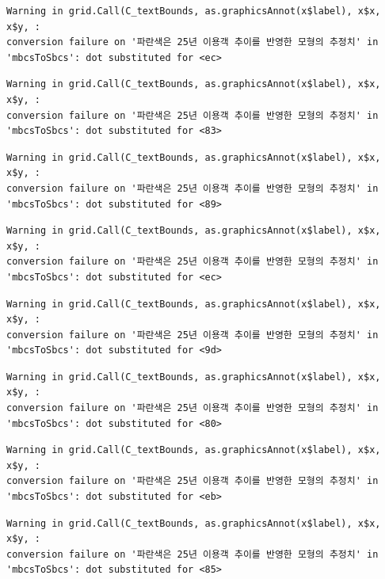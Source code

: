 \documentclass[
  letterpaper,
  DIV=11,
  numbers=noendperiod]{scrreprt}
\begin{document}
\begin{verbatim}
Warning in grid.Call(C_textBounds, as.graphicsAnnot(x$label), x$x, x$y, :
conversion failure on '파란색은 25년 이용객 추이를 반영한 모형의 추정치' in
'mbcsToSbcs': dot substituted for <ec>
\end{verbatim}

\begin{verbatim}
Warning in grid.Call(C_textBounds, as.graphicsAnnot(x$label), x$x, x$y, :
conversion failure on '파란색은 25년 이용객 추이를 반영한 모형의 추정치' in
'mbcsToSbcs': dot substituted for <83>
\end{verbatim}

\begin{verbatim}
Warning in grid.Call(C_textBounds, as.graphicsAnnot(x$label), x$x, x$y, :
conversion failure on '파란색은 25년 이용객 추이를 반영한 모형의 추정치' in
'mbcsToSbcs': dot substituted for <89>
\end{verbatim}

\begin{verbatim}
Warning in grid.Call(C_textBounds, as.graphicsAnnot(x$label), x$x, x$y, :
conversion failure on '파란색은 25년 이용객 추이를 반영한 모형의 추정치' in
'mbcsToSbcs': dot substituted for <ec>
\end{verbatim}

\begin{verbatim}
Warning in grid.Call(C_textBounds, as.graphicsAnnot(x$label), x$x, x$y, :
conversion failure on '파란색은 25년 이용객 추이를 반영한 모형의 추정치' in
'mbcsToSbcs': dot substituted for <9d>
\end{verbatim}

\begin{verbatim}
Warning in grid.Call(C_textBounds, as.graphicsAnnot(x$label), x$x, x$y, :
conversion failure on '파란색은 25년 이용객 추이를 반영한 모형의 추정치' in
'mbcsToSbcs': dot substituted for <80>
\end{verbatim}

\begin{verbatim}
Warning in grid.Call(C_textBounds, as.graphicsAnnot(x$label), x$x, x$y, :
conversion failure on '파란색은 25년 이용객 추이를 반영한 모형의 추정치' in
'mbcsToSbcs': dot substituted for <eb>
\end{verbatim}

\begin{verbatim}
Warning in grid.Call(C_textBounds, as.graphicsAnnot(x$label), x$x, x$y, :
conversion failure on '파란색은 25년 이용객 추이를 반영한 모형의 추정치' in
'mbcsToSbcs': dot substituted for <85>
\end{verbatim}
\end{document}
